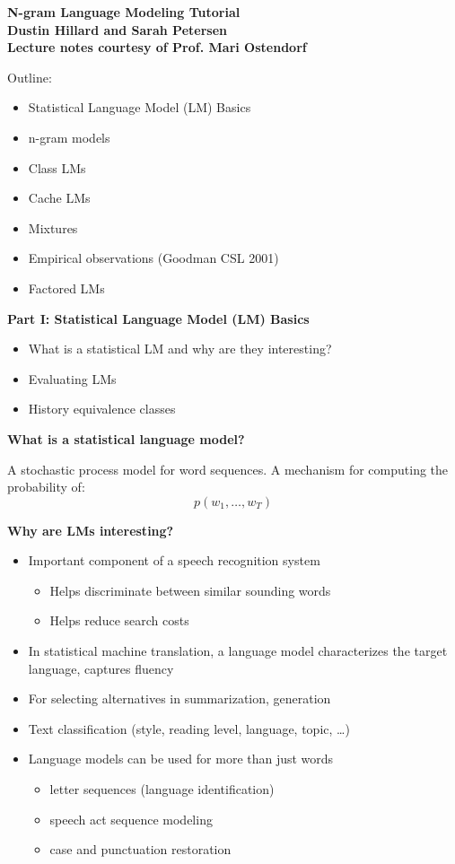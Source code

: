 \documentclass[11pt,titlepage]{article}
\begin{document}
\LARGE
\raggedright

\begin{center}
{\bf
{\huge \bf N-gram Language Modeling Tutorial}\\[0.1in]
Dustin Hillard and Sarah Petersen\\[0.1in]
Lecture notes courtesy of Prof. Mari Ostendorf\\
}
\end{center}
\vskip 0.1in

Outline: 
\begin{itemize}
\item Statistical Language Model (LM) Basics
\item n-gram models
\item Class LMs
\item Cache LMs
\item Mixtures
\item Empirical observations (Goodman CSL 2001)
\item Factored LMs
\end{itemize}

\centerline{\vrule width3in height1pt}
\vskip 0.2in

  \centerline{{\bf Part I: Statistical Language Model (LM) Basics}}
\begin{itemize}
\item What is a statistical LM and why are they interesting?
\item Evaluating LMs
\item History equivalence classes
\end{itemize}

\vskip 0.2in

{\bf What is a statistical language model?}

A stochastic process model for word sequences.  A mechanism for
computing the probability of:
$$p(w_1,\ldots , w_T)$$

\clearpage

{\bf Why are LMs interesting?}
\begin{itemize}
\item Important component of a speech recognition system
\begin{itemize}
\item Helps discriminate between similar sounding words
\item Helps reduce search costs
\end{itemize}
\item In statistical machine translation, a language model characterizes
  the target language, captures fluency
\item For selecting alternatives in summarization, generation
\item Text classification (style, reading level, language, topic, \ldots)
\item Language models can be used for more than just words
\begin{itemize}
\item letter sequences (language identification)
\item speech act sequence modeling
\item case and punctuation restoration 
\end{itemize}
\end{itemize}
\end{document}
